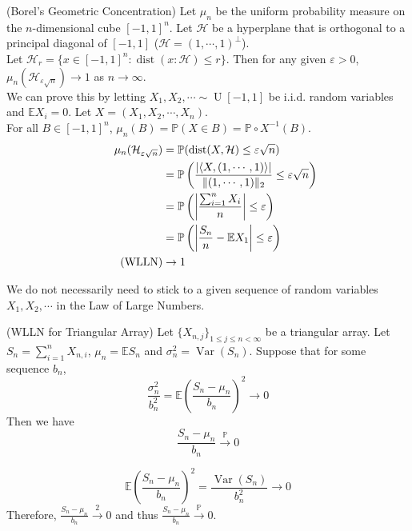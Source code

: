 \documentclass{huhtakm-template-book}
\newcommand{\prob}{\mathbb{P}}
\newcommand{\expect}{\mathbb{E}}
\DeclareMathOperator{\U}{U}
\DeclareMathOperator{\Var}{Var}
\DeclareMathOperator{\dist}{dist}
\begin{document}
    \begin{eg}(Borel's Geometric Concentration)
        Let $\mu_{n}$ be the uniform probability measure on the $n$-dimensional cube $[-1,1]^{n}$. Let $\mathcal{H}$ be a hyperplane that is orthogonal to a principal diagonal of $[-1,1]$ ($\mathcal{H}=(1,\cdots,1)^{\perp}$).\\
        Let $\mathcal{H}_{r}=\{x\in[-1,1]^{n}:\dist(x:\mathcal{H})\leq r\}$. Then for any given $\varepsilon>0$, $\mu_{n}(\mathcal{H}_{\varepsilon\sqrt{n}})\to 1$ as $n\to\infty$.\\
        We can prove this by letting $X_{1},X_{2},\cdots\sim\U[-1,1]$ be i.i.d. random variables and $\expect X_{i}=0$. Let $X=(X_{1},X_{2},\cdots,X_{n})$.\\
        For all $B\in[-1,1]^{n}$, $\mu_{n}(B)=\prob(X\in B)=\prob\circ X^{-1}(B)$.
        \begin{align*}
            \mu_{n}(\mathcal{H}_{\varepsilon\sqrt{n}})&=\prob(\dist(X,\mathcal{H})\leq\varepsilon\sqrt{n})\\
            &=\prob\left(\frac{\abs{\left<X,(1,\cdots,1)\right>}}{\norm{(1,\cdots,1)}_{2}}\leq\varepsilon\sqrt{n}\right)\\
            &=\prob\left(\abs{\frac{\sum_{i=1}^{n}X_{i}}{n}}\leq\varepsilon\right)\\
            &=\prob\left(\abs{\frac{S_{n}}{n}-\expect X_{1}}\leq\varepsilon\right)\\
            \tag{WLLN}
            &\to 1
        \end{align*}
    \end{eg}
    We do not necessarily need to stick to a given sequence of random variables $X_{1},X_{2},\cdots$ in the Law of Large Numbers.
    \begin{thm}(WLLN for Triangular Array)
        Let $\{X_{n,j}\}_{1\leq j\leq n<\infty}$ be a triangular array. Let $S_{n}=\sum_{i=1}^{n}X_{n,i}$, $\mu_{n}=\expect S_{n}$ and $\sigma_{n}^{2}=\Var(S_{n})$. Suppose that for some sequence $b_{n}$,
        \begin{equation*}
            \frac{\sigma_{n}^{2}}{b_{n}^{2}}=\expect\left(\frac{S_{n}-\mu_{n}}{b_{n}}\right)^{2}\to 0
        \end{equation*}
        Then we have
        \begin{equation*}
            \frac{S_{n}-\mu_{n}}{b_{n}}\xrightarrow{\prob}0
        \end{equation*}
    \end{thm}
    \begin{proofing}
        \begin{equation*}
            \expect\left(\frac{S_{n}-\mu_{n}}{b_{n}}\right)^{2}=\frac{\Var(S_{n})}{b_{n}^{2}}\to 0
        \end{equation*}
        Therefore, $\frac{S_{n}-\mu_{n}}{b_{n}}\xrightarrow{2}0$ and thus $\frac{S_{n}-\mu_{n}}{b_{n}}\xrightarrow{\prob}0$.
    \end{proofing}
\end{document}
